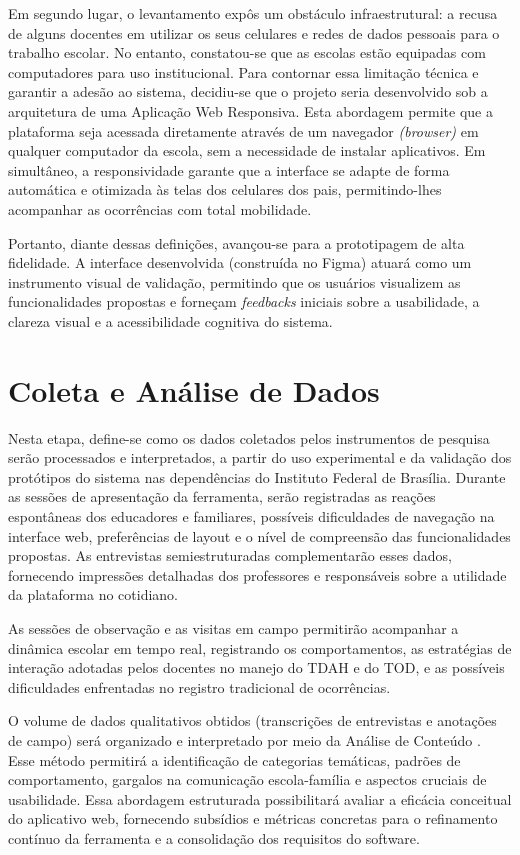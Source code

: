 Em segundo lugar, o levantamento expôs um obstáculo infraestrutural: a recusa de alguns docentes em utilizar os seus celulares e redes de dados pessoais para o trabalho escolar. No entanto, constatou-se que as escolas estão equipadas com computadores para uso institucional. Para contornar essa limitação técnica e garantir a adesão ao sistema, decidiu-se que o projeto seria desenvolvido sob a arquitetura de uma Aplicação Web Responsiva. Esta abordagem permite que a plataforma seja acessada diretamente através de um navegador \textit{(browser)} em qualquer computador da escola, sem a necessidade de instalar aplicativos. Em simultâneo, a responsividade garante que a interface se adapte de forma automática e otimizada às telas dos celulares dos pais, permitindo-lhes acompanhar as ocorrências com total mobilidade.

Portanto, diante dessas definições, avançou-se para a prototipagem de alta fidelidade. A interface desenvolvida (construída no Figma) atuará como um instrumento visual de validação, permitindo que os usuários visualizem as funcionalidades propostas e forneçam \textit{feedbacks} iniciais sobre a usabilidade, a clareza visual e a acessibilidade cognitiva do sistema.

\vspace{0.5cm}
\section{Coleta e Análise de Dados}

Nesta etapa, define-se como os dados coletados pelos instrumentos de pesquisa serão processados e interpretados, a partir do uso experimental e da validação dos protótipos do sistema nas dependências do Instituto Federal de Brasília. Durante as sessões de apresentação da ferramenta, serão registradas as reações espontâneas dos educadores e familiares, possíveis dificuldades de navegação na interface web, preferências de layout e o nível de compreensão das funcionalidades propostas. As entrevistas semiestruturadas complementarão esses dados, fornecendo impressões detalhadas dos professores e responsáveis sobre a utilidade da plataforma no cotidiano.

As sessões de observação e as visitas em campo permitirão acompanhar a dinâmica escolar em tempo real, registrando os comportamentos, as estratégias de interação adotadas pelos docentes no manejo do TDAH e do TOD, e as possíveis dificuldades enfrentadas no registro tradicional de ocorrências.

O volume de dados qualitativos obtidos (transcrições de entrevistas e anotações de campo) será organizado e interpretado por meio da Análise de Conteúdo . Esse método permitirá a identificação de categorias temáticas, padrões de comportamento, gargalos na comunicação escola-família e aspectos cruciais de usabilidade. Essa abordagem estruturada possibilitará avaliar a eficácia conceitual do aplicativo web, fornecendo subsídios e métricas concretas para o refinamento contínuo da ferramenta e a consolidação dos requisitos do software.